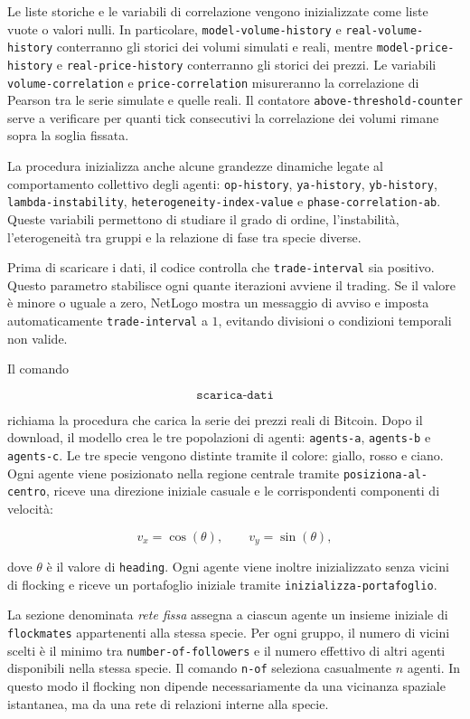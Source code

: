 Le liste storiche e le variabili di correlazione vengono inizializzate come liste
vuote o valori nulli. In particolare, \texttt{model-volume-history} e
\texttt{real-volume-history} conterranno gli storici dei volumi simulati e reali,
mentre \texttt{model-price-history} e \texttt{real-price-history} conterranno gli
storici dei prezzi. Le variabili \texttt{volume-correlation} e
\texttt{price-correlation} misureranno la correlazione di Pearson tra le serie
simulate e quelle reali. Il contatore \texttt{above-threshold-counter} serve a
verificare per quanti tick consecutivi la correlazione dei volumi rimane sopra
la soglia fissata.

La procedura inizializza anche alcune grandezze dinamiche legate al comportamento
collettivo degli agenti: \texttt{op-history}, \texttt{ya-history},
\texttt{yb-history}, \texttt{lambda-instability},
\texttt{heterogeneity-index-value} e \texttt{phase-correlation-ab}. Queste
variabili permettono di studiare il grado di ordine, l'instabilità, l'eterogeneità
tra gruppi e la relazione di fase tra specie diverse.

Prima di scaricare i dati, il codice controlla che \texttt{trade-interval} sia
positivo. Questo parametro stabilisce ogni quante iterazioni avviene il trading.
Se il valore è minore o uguale a zero, NetLogo mostra un messaggio di avviso e
imposta automaticamente \texttt{trade-interval} a \(1\), evitando divisioni o
condizioni temporali non valide.

Il comando

\[
\texttt{scarica-dati}
\]

richiama la procedura che carica la serie dei prezzi reali di Bitcoin. Dopo il
download, il modello crea le tre popolazioni di agenti:
\texttt{agents-a}, \texttt{agents-b} e \texttt{agents-c}. Le tre specie vengono
distinte tramite il colore: giallo, rosso e ciano. Ogni agente viene posizionato
nella regione centrale tramite \texttt{posiziona-al-centro}, riceve una direzione
iniziale casuale e le corrispondenti componenti di velocità:

\[
v_x = \cos(\theta),
\qquad
v_y = \sin(\theta),
\]

dove \(\theta\) è il valore di \texttt{heading}. Ogni agente viene inoltre
inizializzato senza vicini di flocking e riceve un portafoglio iniziale tramite
\texttt{inizializza-portafoglio}.

La sezione denominata \emph{rete fissa} assegna a ciascun agente un insieme
iniziale di \texttt{flockmates} appartenenti alla stessa specie. Per ogni gruppo,
il numero di vicini scelti è il minimo tra \texttt{number-of-followers} e il
numero effettivo di altri agenti disponibili nella stessa specie. Il comando
\texttt{n-of} seleziona casualmente \(n\) agenti. In questo modo il flocking non
dipende necessariamente da una vicinanza spaziale istantanea, ma da una rete di
relazioni interne alla specie.

